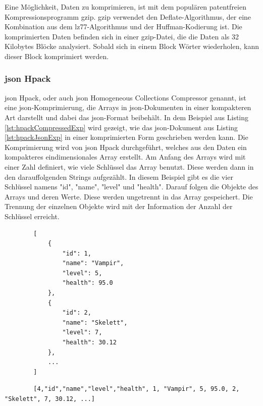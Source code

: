 Eine Möglichkeit, Daten zu komprimieren, ist mit dem populären patentfreien Kompressionsprogramm \ac{gzip}. \ac{gzip} verwendet den Deflate-Algorithmus, der eine Kombination aus dem \ac{lz77}-Algorithmus und der Huffman-Kodierung ist. Die komprimierten Daten befinden sich in einer \ac{gzip}-Datei, die die Daten als 32 Kilobytes Blöcke analysiert. Sobald sich in einem Block Wörter wiederholen, kann dieser Block komprimiert werden. \cite{gnuGzip}\cite{1414952}\cite{seobilityGzipFunktioniert}

\subsubsection{\ac{json} Hpack}
\ac{json} Hpack, oder auch \ac{json} Homogeneous Collections Compressor genannt, ist eine \ac{json}-Komprimierung, die Arrays in \ac{json}-Dokumenten in einer kompakteren Art darstellt und dabei das \ac{json}-Format beibehält. In dem Beispiel aus Listing \ref{lst:hpackCompressedExp} wird gezeigt, wie das \ac{json}-Dokument aus Listing \ref{lst:hpackJsonExp} in einer komprimierten Form geschrieben werden kann. Die Komprimierung wird von \ac{json} Hpack durchgeführt, welches aus den Daten ein kompakteres eindimensionales Array erstellt. Am Anfang des Arrays wird mit einer Zahl definiert, wie viele Schlüssel das Array benutzt. Diese werden dann in den darauffolgenden Strings aufgezählt. In diesem Beispiel gibt es die vier Schlüssel namens "id", "name", "level" und "health". Darauf folgen die Objekte des Arrays und deren Werte. Diese werden ungetrennt in das Array gespeichert. Die Trennung der einzelnen Objekte wird mit der Information der Anzahl der Schlüssel erreicht.
\cite{webreflectionLastVersion}

\begin{listing}[htp]
    \begin{verbatim} 
        [
            {
                "id": 1,
                "name": "Vampir",
                "level": 5,
                "health": 95.0
            },
            {
                "id": 2,
                "name": "Skelett",
                "level": 7,
                "health": 30.12
            },
            ...
        ]                   
    \end{verbatim}
    \caption{}
    \label{lst:hpackJsonExp}
\end{listing}

\begin{listing}[htp]
    \begin{verbatim} 
        [4,"id","name","level","health", 1, "Vampir", 5, 95.0, 2, "Skelett", 7, 30.12, ...]                  
    \end{verbatim}
    \caption{}
    \label{lst:hpackCompressedExp}
\end{listing}


